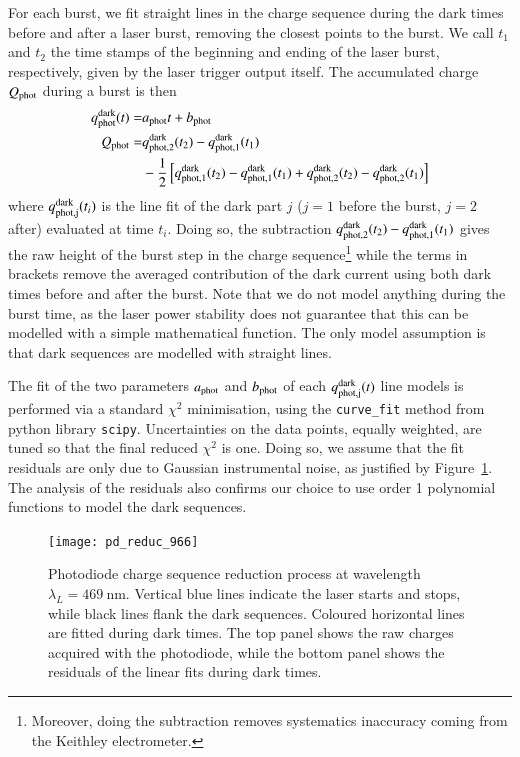 For each burst, we fit straight lines in the charge sequence during the dark times before and after a laser burst, removing the closest points to the burst. We call $t_1$ and $t_2$ the time stamps of the beginning and ending of the laser burst, respectively, given by the laser trigger output itself.%
The accumulated charge $Q_{\mathrm{phot}}$ during a burst is then
\begin{align}
q_{\rm phot}^{\rm dark}(t)  = & a_{\rm phot} t + b_{\rm phot} \\
Q_{\mathrm{phot}}  = & q_{\rm phot,2}^{\rm dark}(t_2) - q_{\rm phot,1}^{\rm dark}(t_1)\\ & - \frac{1}{2} \left[ q_{\rm phot,1}^{\rm dark}(t_2) -  q_{\rm phot,1}^{\rm dark}(t_1) + q_{\rm phot,2}^{\rm dark}(t_2) - q_{\rm phot,2}^{\rm dark}(t_1)  \right]   \notag 
\end{align}
where $q_{\rm phot,j}^{\rm dark}(t_i)$ is the line fit of the dark part $j$ ($j=1$ before the burst, $j=2$ after) evaluated at time $t_i$. Doing so, the subtraction $q_{\rm phot,2}^{\rm dark}(t_2) - q_{\rm phot,1}^{\rm dark}(t_1)$ gives the raw height of the burst step in the charge sequence\footnote{Moreover, doing the subtraction removes systematics inaccuracy coming from the Keithley electrometer.} while the terms in brackets remove the averaged contribution of the dark current using both dark times before and after the burst. Note that we do not model anything during the burst time, as the laser power stability does not guarantee that this can be modelled with a simple mathematical function. The only model assumption is that dark sequences are modelled with straight lines.

The fit of the two parameters $a_{\rm phot}$ and $b_{\rm phot}$ of each $q_{\rm phot,j}^{\rm dark}(t)$ line models is performed via a standard $\chi^2$ minimisation, using the \texttt{curve\_fit} method from python library \texttt{scipy}. Uncertainties on the data points, equally weighted, are tuned so that the final reduced $\chi^2$ is one. Doing so, we assume that the fit residuals are only due to Gaussian instrumental noise, as justified by Figure~\ref{fig:pd_reduc}. The analysis of the residuals also confirms our choice to use order 1 polynomial functions to model the dark sequences.



\begin{figure}[!h]
\centering
\texttt{[image: pd\_reduc\_966]}
\caption{Photodiode charge sequence reduction process at wavelength $\lambda_L=\SI{469}{\nm}$. Vertical blue lines indicate the laser starts and stops, while black lines flank the dark sequences. Coloured horizontal lines are fitted during dark times. The top panel shows the raw charges acquired with the photodiode, while the bottom panel shows the residuals of the linear fits during dark times.}\label{fig:pd_reduc}
\end{figure}

